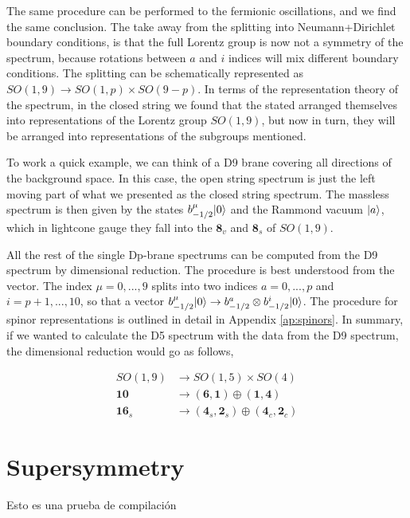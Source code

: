 The same procedure can be performed to the fermionic oscillations, and we find the same conclusion. The take away from the splitting into Neumann+Dirichlet boundary conditions, is that the full Lorentz group is now not a symmetry of the spectrum, because rotations between $a$ and $i$ indices will mix different boundary conditions. The splitting can be schematically represented as $SO(1,9) \rightarrow SO(1,p) \times SO(9-p)$. In terms of the representation theory of the spectrum, in the closed string we found that the stated arranged themselves into representations of the Lorentz group $SO(1,9)$, but now in turn, they will be arranged into representations of the subgroups mentioned.

To work a quick example, we can think of a D9 brane covering all directions of the background space. In this case, the open string spectrum is just the left moving part of what we presented as the closed string spectrum. The massless spectrum is then given by the states $b_{-1/2}^\mu \lvert0\rangle$ and the Rammond vacuum $\lvert a\rangle$, which in lightcone gauge they fall into the $\mathbf{8}_v$ and $\mathbf{8}_s$ of $SO(1,9)$.

All the rest of the single Dp-brane spectrums can be computed from the D9 spectrum by dimensional reduction. The procedure is best understood from the vector. The index $\mu = 0,...,9$ splits into two indices $a = 0,...,p$ and $i = p+1,...,10$, so that a vector $b_{-1/2}^\mu \lvert0\rangle \rightarrow b_{-1/2}^a \otimes b_{-1/2}^i \lvert0\rangle$. The procedure for spinor representations is outlined in detail in Appendix \ref{ap:spinors}. In summary, if we wanted to calculate the D5 spectrum with the data from the D9 spectrum, the dimensional reduction would go as follows,

\begin{align*}
    SO(1,9) &\rightarrow SO(1,5) \times SO(4) \\
    \mathbf{10} &\rightarrow (\mathbf{6},\mathbf{1}) \oplus (\mathbf{1}, \mathbf{4}) \\
    \mathbf{16}_s &\rightarrow (\mathbf{4}_s, \mathbf{2}_s) \oplus (\mathbf{4}_c, \mathbf{2}_c)
\end{align*}

\section{Supersymmetry}


Esto es una prueba de compilación